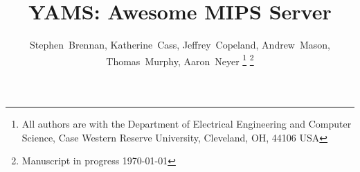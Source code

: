 \documentclass[journal,10pt]{IEEEtran}
\begin{document}
%
\title{YAMS: Awesome MIPS Server}

%
%
%

\author{
Stephen~Brennan,
Katherine~Cass,
Jeffrey~Copeland,
Andrew~Mason,
Thomas~Murphy,
Aaron~Neyer%
\thanks{All authors are with the Department of Electrical Engineering and Computer Science, Case Western Reserve University, Cleveland, OH, 44106 USA}%
\thanks{Manuscript in progress \today}
} %

%
%



%
{}
\end{document}
